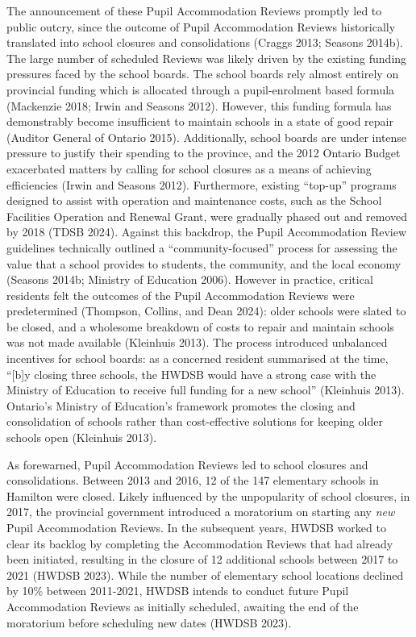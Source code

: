 \documentclass[
default
]{sn-jnl}
\begin{document}
The announcement of these Pupil Accommodation Reviews promptly led to
public outcry, since the outcome of Pupil Accommodation Reviews
historically translated into school closures and consolidations (Craggs
2013; Seasons 2014b). The large number of scheduled Reviews was likely
driven by the existing funding pressures faced by the school boards. The
school boards rely almost entirely on provincial funding which is
allocated through a pupil-enrolment based formula (Mackenzie 2018; Irwin
and Seasons 2012). However, this funding formula has demonstrably become
insufficient to maintain schools in a state of good repair (Auditor
General of Ontario 2015). Additionally, school boards are under intense
pressure to justify their spending to the province, and the 2012 Ontario
Budget exacerbated matters by calling for school closures as a means of
achieving efficiencies (Irwin and Seasons 2012). Furthermore, existing
``top-up'' programs designed to assist with operation and maintenance
costs, such as the School Facilities Operation and Renewal Grant, were
gradually phased out and removed by 2018 (TDSB 2024). Against this
backdrop, the Pupil Accommodation Review guidelines technically outlined
a ``community-focused'' process for assessing the value that a school
provides to students, the community, and the local economy (Seasons
2014b; Ministry of Education 2006). However in practice, critical
residents felt the outcomes of the Pupil Accommodation Reviews were
predetermined (Thompson, Collins, and Dean 2024): older schools were
slated to be closed, and a wholesome breakdown of costs to repair and
maintain schools was not made available (Kleinhuis 2013). The process
introduced unbalanced incentives for school boards: as a concerned
resident summarised at the time, ``{[}b{]}y closing three schools, the
HWDSB would have a strong case with the Ministry of Education to receive
full funding for a new school'' (Kleinhuis 2013). Ontario's Ministry of
Education's framework promotes the closing and consolidation of schools
rather than cost-effective solutions for keeping older schools open
(Kleinhuis 2013).

As forewarned, Pupil Accommodation Reviews led to school closures and
consolidations. Between 2013 and 2016, 12 of the 147 elementary schools
in Hamilton were closed. Likely influenced by the unpopularity of school
closures, in 2017, the provincial government introduced a moratorium on
starting any \emph{new} Pupil Accommodation Reviews. In the subsequent
years, HWDSB worked to clear its backlog by completing the Accommodation
Reviews that had already been initiated, resulting in the closure of 12
additional schools between 2017 to 2021 (HWDSB 2023). While the number
of elementary school locations declined by 10\% between 2011-2021, HWDSB
intends to conduct future Pupil Accommodation Reviews as initially
scheduled, awaiting the end of the moratorium before scheduling new
dates (HWDSB 2023).
\end{document}
